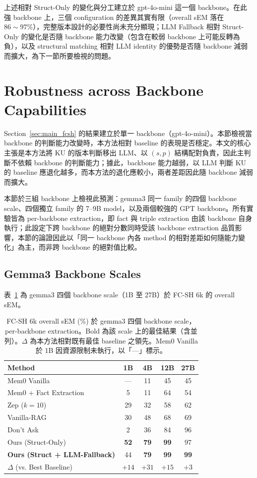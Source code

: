 上述相對 Struct-Only 的變化與分工建立於 gpt-4o-mini 這一個 backbone。在此強 backbone 上，三個 configuration 的差異其實有限（overall sEM 落在 $86\sim97\%$），完整版本設計的必要性尚未充分顯現；LLM Fallback 相對 Struct-Only 的變化是否隨 backbone 能力改變（包含在較弱 backbone 上可能反轉為負），以及 structural matching 相對 LLM identity 的優勢是否隨 backbone 減弱而擴大，為下一節所要檢視的問題。
 
\section{Robustness across Backbone Capabilities}
\label{sec:backbone_robustness}
 
Section~\ref{sec:main_fcsh} 的結果建立於單一 backbone（gpt-4o-mini）。本節檢視當 backbone 的判斷能力改變時，本方法相對 baseline 的表現是否穩定。本文的核心主張是本方法將 KU 的版本判斷移出 LLM、以 $(s, p)$ 結構配對負責，因此主判斷不依賴 backbone 的判斷能力；據此，backbone 能力越弱，以 LLM 判斷 KU 的 baseline 應退化越多，而本方法的退化應較小，兩者差距因此隨 backbone 減弱而擴大。
 
本節於三組 backbone 上檢視此預測：gemma3 同一 family 的四個 backbone scale、四個獨立 family 的 7--9B model，以及兩個較強的 GPT backbone。所有實驗皆為 per-backbone extraction，即 fact 與 triple extraction 由該 backbone 自身執行；此設定下跨 backbone 的絕對分數同時受該 backbone extraction 品質影響，本節的論證因此以「同一 backbone 內各 method 的相對差距如何隨能力變化」為主，而非跨 backbone 的絕對值比較。
 
\subsection{Gemma3 Backbone Scales}
\label{subsec:gemma3}
 
表~\ref{tab:gemma3} 為 gemma3 四個 backbone scale（1B 至 27B）於 FC-SH 6k 的 overall sEM。
 
\begin{table}[!htb]
\centering
\caption{FC-SH 6k overall sEM (\%) 於 gemma3 四個 backbone scale，per-backbone extraction。Bold 為該 scale 上的最佳結果（含並列）。$\Delta$ 為本方法相對既有最佳 baseline 之領先。Mem0 Vanilla 於 1B 因資源限制未執行，以「—」標示。}
\label{tab:gemma3}
\small
\begin{tabular}{lcccc}
\toprule
Method & 1B & 4B & 12B & 27B \\
\midrule
Mem0 Vanilla & — & 11 & 45 & 45 \\
Mem0 + Fact Extraction & 5 & 11 & 64 & 54 \\
Zep ($k=10$) & 29 & 32 & 58 & 62 \\
Vanilla-RAG & 30 & 48 & 68 & 69 \\
Don't Ask & 2 & 36 & 84 & 96 \\
\midrule
Ours (Struct-Only) & \textbf{52} & \textbf{79} & \textbf{99} & 97 \\
\textbf{Ours (Struct + LLM-Fallback)} & 44 & \textbf{79} & \textbf{99} & \textbf{99} \\
\midrule
$\Delta$ (vs. Best Baseline) & $+14$ & $+31$ & $+15$ & $+3$ \\
\bottomrule
\end{tabular}
\end{table}
 
